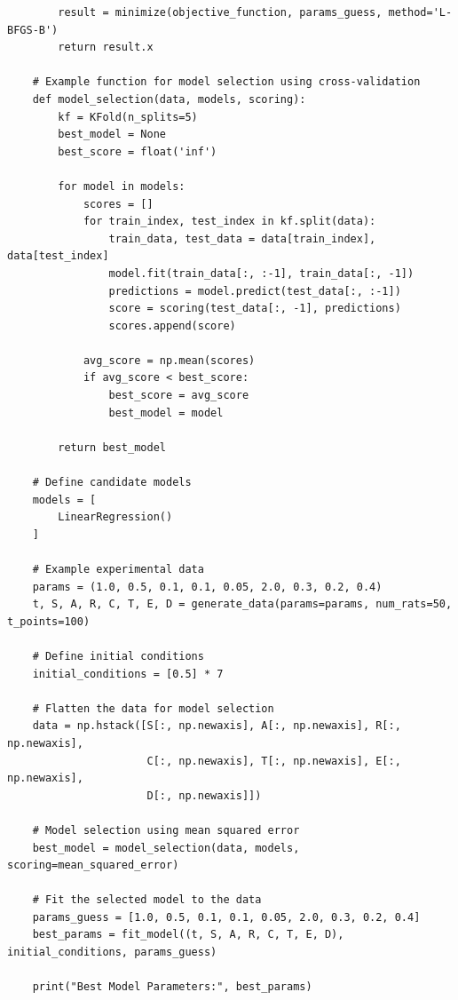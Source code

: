 \documentclass[english, a4paper, 11pt]{article}
\begin{document}
\begin{lstlisting}
        result = minimize(objective_function, params_guess, method='L-BFGS-B')
        return result.x
    
    # Example function for model selection using cross-validation
    def model_selection(data, models, scoring):
        kf = KFold(n_splits=5)
        best_model = None
        best_score = float('inf')
    
        for model in models:
            scores = []
            for train_index, test_index in kf.split(data):
                train_data, test_data = data[train_index], data[test_index]
                model.fit(train_data[:, :-1], train_data[:, -1])
                predictions = model.predict(test_data[:, :-1])
                score = scoring(test_data[:, -1], predictions)
                scores.append(score)
    
            avg_score = np.mean(scores)
            if avg_score < best_score:
                best_score = avg_score
                best_model = model
    
        return best_model
    
    # Define candidate models
    models = [
        LinearRegression()
    ]
    
    # Example experimental data
    params = (1.0, 0.5, 0.1, 0.1, 0.05, 2.0, 0.3, 0.2, 0.4)
    t, S, A, R, C, T, E, D = generate_data(params=params, num_rats=50, t_points=100)
    
    # Define initial conditions
    initial_conditions = [0.5] * 7
    
    # Flatten the data for model selection
    data = np.hstack([S[:, np.newaxis], A[:, np.newaxis], R[:, np.newaxis],
                      C[:, np.newaxis], T[:, np.newaxis], E[:, np.newaxis], 
                      D[:, np.newaxis]])
    
    # Model selection using mean squared error
    best_model = model_selection(data, models, scoring=mean_squared_error)
    
    # Fit the selected model to the data
    params_guess = [1.0, 0.5, 0.1, 0.1, 0.05, 2.0, 0.3, 0.2, 0.4]
    best_params = fit_model((t, S, A, R, C, T, E, D), initial_conditions, params_guess)
    
    print("Best Model Parameters:", best_params)
    
\end{lstlisting}


\printbibliography
\end{document}
